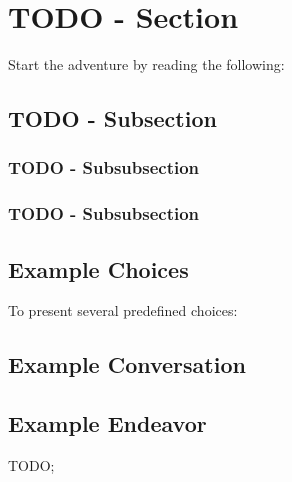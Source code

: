 \section{TODO - Section}
\label{sec:todoSection}

Start the adventure by reading the following:

\quoteBox{
	\lipsum[1][1-5]
}

\lipsum[2]


\subsection{TODO - Subsection}

\lipsum[1]

\subsubsection{TODO - Subsubsection}

\lipsum[2][1-3]

\subsubsection{TODO - Subsubsection}

\lipsum[3][1-3]

\newpage



\subsection{Example Choices}

To present several predefined choices:






\subsection{Example Conversation}


\lipsum[1][1-3]


\vspace{0.5cm}


\newpage
\subsection{Example Endeavor}

TODO; \lipsum[1][1-3]



